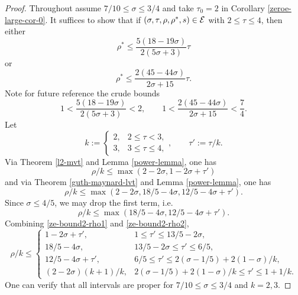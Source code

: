 \begin{proof}

Throughout assume $7/10 \le \sigma \le 3/4$ and take $\tau_0 = 2$ in Corollary \ref{zeroe-large-cor-0}. It suffices to show that if $(\sigma, \tau, \rho, \rho^*, s) \in \mathcal{E}$ with $2 \le \tau \le 4$, then either
\begin{equation}
\rho^* \le \frac{5(18 - 19\sigma)}{2(5\sigma + 3)}\tau
\end{equation}
or
\begin{equation}
\rho^* \le \frac{2(45 - 44\sigma)}{2\sigma + 15}\tau.
\end{equation}
Note for future reference the crude bounds
\begin{equation}\label{ze-bound2-tau-factor-bounds}
1 < \frac{5(18 - 19\sigma)}{2(5\sigma + 3)} < 2,\qquad 1 < \frac{2(45 - 44\sigma)}{2\sigma + 15} < \frac{7}{4}.
\end{equation}
Let
\[
k := \begin{cases}
2,& 2 \le \tau < 3,\\
3,& 3 \le \tau \le 4,
\end{cases},\qquad \tau' := \tau/k.
\]
Via Theorem \ref{l2-mvt} and Lemma \ref{power-lemma}, one has
\begin{equation}\label{ze-bound2-rho1}
\rho/k \le \max(2 - 2\sigma, 1 - 2\sigma + \tau')
\end{equation}
and via Theorem \ref{guth-maynard-lvt} and Lemma \ref{power-lemma}, one has
\[
\rho/k\le \max(2 - 2\sigma, 18/5 - 4\sigma, 12/5 - 4\sigma + \tau').
\]
Since $\sigma \le 4/5$, we may drop the first term, i.e.
\begin{equation}\label{ze-bound2-rho2}
\rho/k \le \max(18/5 - 4\sigma, 12/5 - 4\sigma + \tau').
\end{equation}
Combining \eqref{ze-bound2-rho1} and \eqref{ze-bound2-rho2},
\begin{equation}\label{ze-bound2-rhok-bound}
\rho/k \le \begin{cases}
1 - 2\sigma + \tau',&1 \le \tau' \le 13/5 - 2\sigma,\\
18/5 - 4\sigma,& 13/5 - 2\sigma \le \tau' \le 6/5,\\
12/5 - 4\sigma + \tau',& 6/5 \le \tau' \le 2(\sigma - 1/5) + 2(1 - \sigma)/k,\\
(2 - 2\sigma)(k + 1)/k,& 2(\sigma - 1/5) + 2(1 - \sigma)/k \le \tau' \le 1 + 1/k.
\end{cases}
\end{equation}
One can verify that all intervals are proper for $7/10 \le \sigma \le 3/4$ and $k = 2,3$.


\end{proof}
